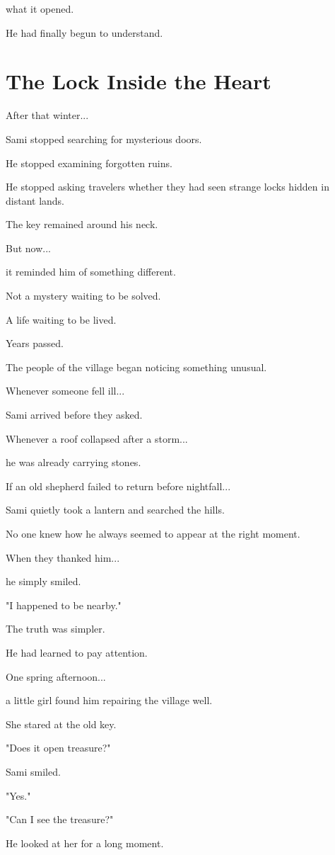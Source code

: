 \documentclass[12pt,openany]{book}
\begin{document}
what it opened.

He had finally begun to understand.
\section*{The Lock Inside the Heart}

After that winter...

Sami stopped searching for mysterious doors.

He stopped examining forgotten ruins.

He stopped asking travelers whether they had seen strange locks hidden in distant lands.

The key remained around his neck.

But now...

it reminded him of something different.

Not a mystery waiting to be solved.

A life waiting to be lived.

Years passed.

The people of the village began noticing something unusual.

Whenever someone fell ill...

Sami arrived before they asked.

Whenever a roof collapsed after a storm...

he was already carrying stones.

If an old shepherd failed to return before nightfall...

Sami quietly took a lantern and searched the hills.

No one knew how he always seemed to appear at the right moment.

When they thanked him...

he simply smiled.

"I happened to be nearby."

The truth was simpler.

He had learned to pay attention.

One spring afternoon...

a little girl found him repairing the village well.

She stared at the old key.

"Does it open treasure?"

Sami smiled.

"Yes."

"Can I see the treasure?"

He looked at her for a long moment.
\end{document}
